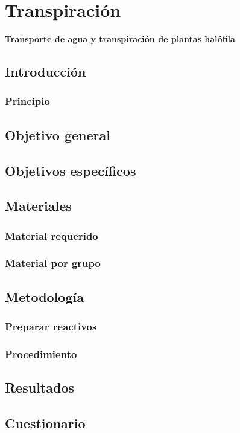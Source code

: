 \chapter[Transporte de agua y transpiraci\'on de plantas hal\'ofila]{Transpiraci\'on}

\begin{Huge}
	\begin{center}
		\textbf{Transporte de agua y transpiraci\'on de plantas hal\'ofila}
	\end{center}
\end{Huge}

\section{Introducci\'on}

\subsection{Principio}

\section{Objetivo general}

\section{Objetivos espec\'ificos}

\section{Materiales}

\subsection{Material requerido}

\subsection{Material por grupo}

\section{Metodolog\'ia}

\subsection{Preparar reactivos}

\subsection{Procedimiento}

\section{Resultados}

\section{Cuestionario}